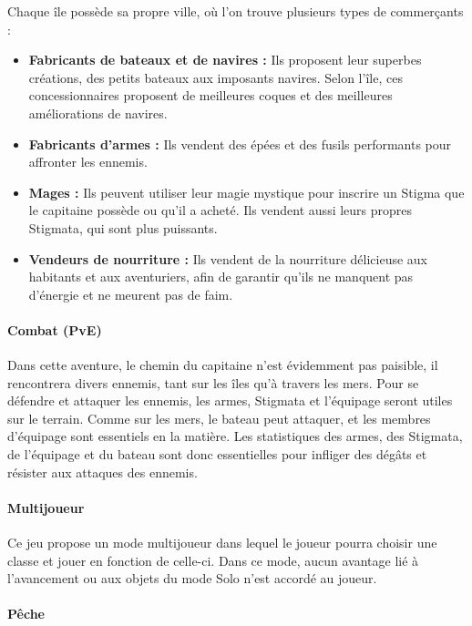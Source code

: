 \documentclass{article}
\begin{document}
Chaque île possède sa propre ville, où l’on trouve plusieurs types de commerçants : 
\begin{itemize}
    \item \textbf{Fabricants de bateaux et de navires :} Ils proposent leur superbes créations, des petits bateaux aux imposants navires. Selon l'île, ces concessionnaires proposent de meilleures coques et des meilleures améliorations de navires.
    \item \textbf{Fabricants d'armes :} Ils vendent des épées et des fusils performants pour affronter les ennemis.
    \item \textbf{Mages :} Ils peuvent utiliser leur magie mystique pour inscrire un Stigma que le capitaine possède ou qu’il a acheté. Ils vendent aussi leurs propres Stigmata, qui sont plus puissants.
    \item \textbf{Vendeurs de nourriture :} Ils vendent de la nourriture délicieuse aux habitants et aux aventuriers, afin de garantir qu'ils ne manquent pas d'énergie et ne meurent pas de faim.
\end{itemize}

\paragraph{Combat (PvE)}\hfill

Dans cette aventure, le chemin du capitaine n’est évidemment pas paisible, il rencontrera divers ennemis, tant sur les îles qu’à travers les mers. Pour se défendre et attaquer les ennemis, les armes, Stigmata et l’équipage seront utiles sur le terrain. Comme sur les mers, le bateau peut attaquer, et les membres d'équipage sont essentiels en la matière. Les statistiques des armes, des Stigmata, de l’équipage et du bateau sont donc essentielles pour infliger des dégâts et résister aux attaques des ennemis.

\paragraph{Multijoueur}\hfill

Ce jeu propose un mode multijoueur dans lequel le joueur pourra choisir une classe et jouer en fonction de celle-ci. Dans ce mode, aucun avantage lié à l'avancement ou aux objets du mode Solo n'est accordé au joueur.

\paragraph{Pêche}\hfill
\end{document}
